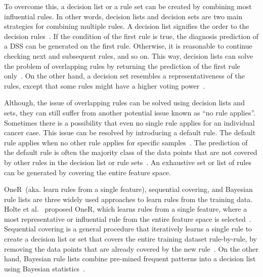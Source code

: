 \hspace*{3.5mm} To overcome this, a decision list or a rule set can be created by combining most influential rules. In other words, decision lists and decision sets are two main strategies for combining multiple rules. 
A decision list signifies the order to the decision rules~\cite{molnar2019interpretable}. If the condition of the first rule is true, the diagnosis prediction of a DSS can be generated on the first rule. Otherwise, it is reasonable to continue checking next and subsequent rules, and so on. This way, decision lists can solve the problem of overlapping rules by returning the prediction of the first rule only~\cite{molnar2019interpretable}. On the other hand, a decision set resembles a representativeness of the rules, except that some rules might have a higher voting power~\cite{molnar2019interpretable}. 

\hspace*{3.5mm} Although, the issue of overlapping rules can be solved using decision lists and sets, they can still suffer from another potential issue known as ``no rule applies''. Sometimes there is a possibility that even no single rule applies for an individual cancer case.
This issue can be resolved by introducing a default rule. The default rule applies when no other rule applies for specific samples~\cite{molnar2019interpretable}. The prediction of the default rule is often the majority class of the data points that are not covered by other rules in the decision list or rule sets~\cite{molnar2019interpretable}. An exhaustive set or list of rules can be generated by covering the entire feature space. 

\hspace*{3.5mm} OneR~(aka. learn rules from a single feature), sequential covering, and Bayesian rule lists are three widely used approaches to learn rules from the training data. Holte et al.~\cite{holte1993very} proposed OneR, which learns rules from a single feature, where a most representative or influential rule from the entire feature space is selected~\cite{molnar2019interpretable}. Sequential covering is a general procedure that iteratively learns a single rule to create a decision list or set that covers the entire training dataset rule-by-rule, by removing the data points that are already covered by the new rule~\cite{molnar2019interpretable}. On the other hand, Bayesian rule lists combine pre-mined frequent patterns into a decision list using Bayesian statistics~\cite{molnar2019interpretable}. 

